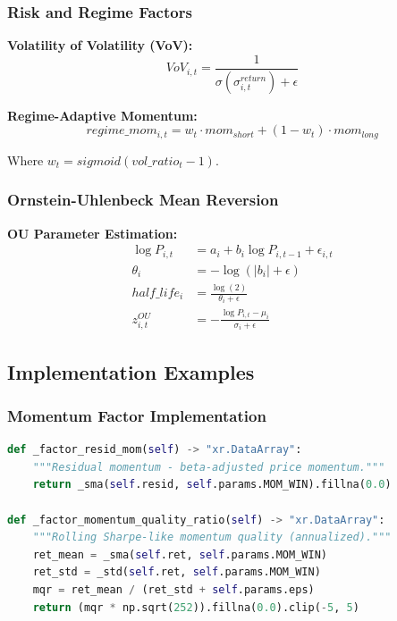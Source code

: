 \documentclass[11pt,letterpaper]{book}
\begin{document}
\subsubsection{Risk and Regime Factors}

\textbf{Volatility of Volatility (VoV):}
\begin{equation}
VoV_{i,t} = \frac{1}{\sigma(\sigma_{i,t}^{return}) + \epsilon}
\end{equation}

\textbf{Regime-Adaptive Momentum:}
\begin{equation}
regime\_mom_{i,t} = w_t \cdot mom_{short} + (1-w_t) \cdot mom_{long}
\end{equation}

Where $w_t = sigmoid(vol\_ratio_t - 1)$.

\subsubsection{Ornstein-Uhlenbeck Mean Reversion}

\textbf{OU Parameter Estimation:}
\begin{align}
\log P_{i,t} &= a_i + b_i \log P_{i,t-1} + \epsilon_{i,t} \\
\theta_i &= -\log(|b_i| + \epsilon) \\
half\_life_i &= \frac{\log(2)}{\theta_i + \epsilon} \\
z_{i,t}^{OU} &= -\frac{\log P_{i,t} - \mu_i}{\sigma_i + \epsilon}
\end{align}

\subsection{Implementation Examples}

\subsubsection{Momentum Factor Implementation}

\begin{lstlisting}[language=Python,caption=Q23 Momentum Factor Implementation]
def _factor_resid_mom(self) -> "xr.DataArray":
    """Residual momentum - beta-adjusted price momentum."""
    return _sma(self.resid, self.params.MOM_WIN).fillna(0.0)

def _factor_momentum_quality_ratio(self) -> "xr.DataArray":
    """Rolling Sharpe-like momentum quality (annualized)."""
    ret_mean = _sma(self.ret, self.params.MOM_WIN)
    ret_std = _std(self.ret, self.params.MOM_WIN)
    mqr = ret_mean / (ret_std + self.params.eps)
    return (mqr * np.sqrt(252)).fillna(0.0).clip(-5, 5)
\end{lstlisting}
\end{document}
